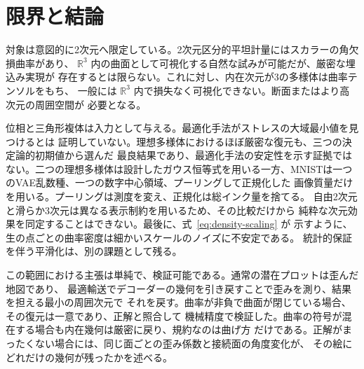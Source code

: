 \clearpage
\section{限界と結論}
\label{sec:conclusion}

対象は意図的に2次元へ限定している。2次元区分的平坦計量にはスカラーの角欠損曲率があり、
$\mathbb R^3$ 内の曲面として可視化する自然な試みが可能だが、厳密な埋込み実現が
存在するとは限らない。これに対し、内在次元が3の多様体は曲率テンソルをもち、
一般には $\mathbb R^3$ 内で損失なく可視化できない。断面またはより高次元の周囲空間が
必要となる。

位相と三角形複体は入力として与える。最適化手法がストレスの大域最小値を見つけるとは
証明していない。理想多様体におけるほぼ厳密な復元も、三つの決定論的初期値から選んだ
最良結果であり、最適化手法の安定性を示す証拠ではない。二つの理想多様体は設計したガウス恒等式を用いる一方、MNISTは一つのVAE乱数種、一つの数字中心領域、プーリングして正規化した
画像質量だけを用いる。プーリングは測度を変え、正規化は総インク量を捨てる。
自由2次元と滑らか3次元は異なる表示制約を用いるため、その比較だけから
純粋な次元効果を同定することはできない。最後に、式~\eqref{eq:density-scaling} が
示すように、生の点ごとの曲率密度は細かいスケールのノイズに不安定である。
統計的保証を伴う平滑化は、別の課題として残る。

この範囲における主張は単純で、検証可能である。通常の潜在プロットは歪んだ地図であり、
最適輸送でデコーダーの幾何を引き戻すことで歪みを測り、結果を担える最小の周囲次元で
それを戻す。曲率が非負で曲面が閉じている場合、その復元は一意であり、正解と照合して
機械精度で検証した。曲率の符号が混在する場合も内在幾何は厳密に戻り、規約なのは曲げ方
だけである。正解がまったくない場合には、同じ面ごとの歪み係数と接続面の角度変化が、
その絵にどれだけの幾何が残ったかを述べる。
